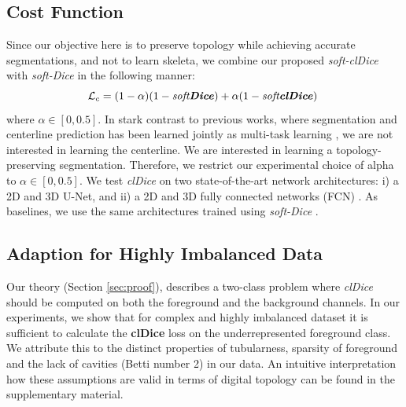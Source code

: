 \subsection{Cost Function}
Since our objective here is to preserve topology while achieving accurate segmentations, and not to learn skeleta, we combine our proposed \textit{soft-clDice} with \textit{soft-Dice} in the following manner: 
\begin{equation}
\mathcal{L}_{c} = (1-\alpha)(1-\mbox{\textit{soft\textbf{Dice}})}+\alpha(1-\mbox{\textit{soft\textbf{clDice}}) }
\label{eq3}
\end{equation}
where $\alpha \in [0,0.5]$. In stark contrast to previous works, where segmentation and centerline prediction has been learned jointly as multi-task learning \cite{uslu2018multi,tetteh2018deepvesselnet}, we are not interested in learning the centerline. We are interested in learning a topology-preserving segmentation. Therefore, we restrict our experimental choice of alpha to $\alpha \in [0,0.5]$.
We test \textit{clDice} on two state-of-the-art network architectures: i) a 2D and 3D U-Net\cite{ronneberger2015u,cciccek20163d}, and ii) a 2D and 3D fully connected networks (FCN) \cite{tetteh2018deepvesselnet,gerlRSOM}. As baselines, we use the same architectures trained using \textit{soft-Dice} \cite{milletari2016v,sudre2017generalised}.

\subsection{Adaption for Highly Imbalanced Data}
Our theory  (Section \ref{sec:proof}), describes a two-class problem where \textit{clDice} should be computed on both the foreground and the background channels. In our experiments, we show that for complex and highly imbalanced dataset it is sufficient to calculate the \textbf{clDice} loss on the underrepresented foreground class. We attribute this to the distinct properties of tubularness, sparsity of foreground and the lack of cavities (Betti number 2) in our data. An intuitive interpretation how these assumptions are valid in terms of digital topology can be found in the supplementary material.


